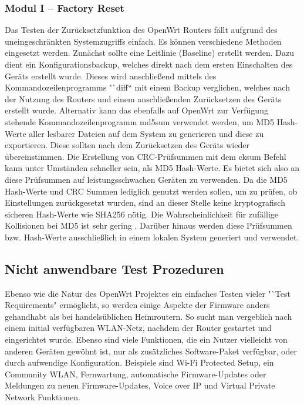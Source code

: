 \documentclass[a4paper]{book}
\begin{document}
\begin{large}
\subsubsection{Modul I – Factory Reset}
\begin{onehalfspace}
Das Testen der Zurücksetzfunktion des OpenWrt Routers fällt aufgrund des uneingeschränkten Systemzugriffs einfach. Es können verschiedene Methoden eingesetzt werden. Zunächst sollte eine Leitlinie (Baseline) erstellt werden. Dazu dient ein Konfigurationsbackup, welches direkt nach dem ersten Einschalten des Geräts erstellt wurde. Dieses wird anschließend mittels des Kommandozeilenprogramms "`diff“ mit einem Backup verglichen, welches nach der Nutzung des Routers und einem anschließenden Zurücksetzen des Geräts erstellt wurde. Alternativ kann das ebenfalls auf OpenWrt zur Verfügung stehende Kommandozeilenprogramm \glqq md5sum\grqq{} verwendet werden, um MD5 Hash-Werte aller lesbarer Dateien auf dem System zu generieren und diese zu exportieren. Diese sollten nach dem Zurücksetzen des Geräts wieder übereinstimmen. Die Erstellung von CRC-Prüfsummen mit dem \glqq cksum\grqq{} Befehl kann unter Umständen schneller sein, als MD5 Hash-Werte. Es bietet sich also an diese Prüfsummen auf leistungsschwachen Geräten zu verwenden. Da die MD5 Hash-Werte und CRC Summen lediglich genutzt werden sollen, um zu prüfen, ob Einstellungen zurückgesetzt wurden, sind an dieser Stelle keine kryptografisch sicheren Hash-Werte wie SHA256 nötig. Die Wahrscheinlichkeit für zufällige Kollisionen bei MD5 ist sehr gering \cite{Rivest.1992}. Darüber hinaus werden diese Prüfsummen bzw. Hash-Werte ausschließlich in einem lokalen System generiert und verwendet. 
\end{onehalfspace}

\subsection{Nicht anwendbare Test Prozeduren}
\begin{onehalfspace}
Ebenso wie die Natur des OpenWrt Projektes ein einfaches Testen vieler "`Test \mbox Requirements"{} ermöglicht, so werden einige Aspekte der Firmware anders gehandhabt als bei handelsüblichen Heimroutern. So sucht man vergeblich nach einem initial verfügbaren WLAN-Netz, nachdem der Router gestartet und eingerichtet wurde. Ebenso sind viele Funktionen, die ein Nutzer vielleicht von anderen Geräten gewöhnt ist, nur als zusätzliches Software-Paket verfügbar, oder durch aufwendige Konfiguration. Beispiele sind Wi-Fi Protected Setup, ein Community WLAN, Fernwartung, automatische Firmware-Updates oder Meldungen zu neuen Firmware-Updates, Voice over IP und Virtual Private Network Funktionen. 
\end{onehalfspace}


\end{large}
\end{document}
